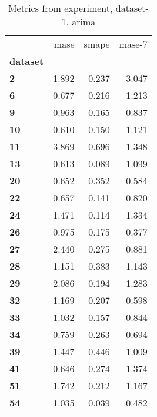 \begin{table}[h]
\centering
\caption{Metrics from experiment, dataset-1, arima}
\label{table:arima-dataset-1}
\begin{tabular}{lrrr}
\toprule
{} &   mase &  smape &  mase-7 \\
\textbf{dataset} &        &        &         \\
\midrule
\textbf{2      } &  1.892 &  0.237 &   3.047 \\
\textbf{6      } &  0.677 &  0.216 &   1.213 \\
\textbf{9      } &  0.963 &  0.165 &   0.837 \\
\textbf{10     } &  0.610 &  0.150 &   1.121 \\
\textbf{11     } &  3.869 &  0.696 &   1.348 \\
\textbf{13     } &  0.613 &  0.089 &   1.099 \\
\textbf{20     } &  0.652 &  0.352 &   0.584 \\
\textbf{22     } &  0.657 &  0.141 &   0.820 \\
\textbf{24     } &  1.471 &  0.114 &   1.334 \\
\textbf{26     } &  0.975 &  0.175 &   0.377 \\
\textbf{27     } &  2.440 &  0.275 &   0.881 \\
\textbf{28     } &  1.151 &  0.383 &   1.143 \\
\textbf{29     } &  2.086 &  0.194 &   1.283 \\
\textbf{32     } &  1.169 &  0.207 &   0.598 \\
\textbf{33     } &  1.032 &  0.157 &   0.844 \\
\textbf{34     } &  0.759 &  0.263 &   0.694 \\
\textbf{39     } &  1.447 &  0.446 &   1.009 \\
\textbf{41     } &  0.646 &  0.274 &   1.374 \\
\textbf{51     } &  1.742 &  0.212 &   1.167 \\
\textbf{54     } &  1.035 &  0.039 &   0.482 \\
\bottomrule
\end{tabular}
\end{table}
